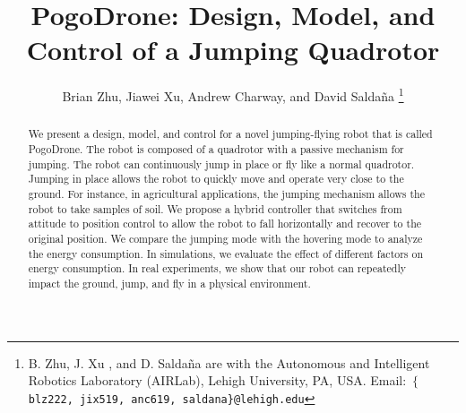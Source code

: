 \documentclass[letterpaper,10pt,conference]{ieeeconf}
\newcommand{\andrew}[1]{{\color{green}#1}}
\begin{document}
\title{\bf 
PogoDrone: Design, Model, and Control  of a Jumping Quadrotor
}
\author{Brian Zhu, Jiawei Xu, Andrew Charway, and David Saldaña
\thanks{
B. Zhu, J. Xu , and D. Salda\~{n}a are with the Autonomous and Intelligent Robotics Laboratory (AIRLab), Lehigh University, PA, USA. Email:~$\{$\texttt{blz222, jix519, anc619, saldana\}@lehigh.edu}}
}
\maketitle
\begin{abstract}
We present a design, model, and control for a novel jumping-flying robot that is called PogoDrone. The robot is composed of a quadrotor with a passive mechanism for jumping.
%
The robot can continuously jump in place or fly like a normal quadrotor. Jumping in place allows the robot to quickly move and operate very close to the ground.
For instance, in agricultural applications, the jumping mechanism allows the robot to take samples of soil.
We propose a hybrid controller that switches from attitude to position control to allow the robot to fall horizontally and recover to the original position.
We compare the jumping mode with the hovering mode to analyze the energy consumption.
In simulations, we evaluate the effect of different factors
on energy consumption. In real experiments, we show that our robot can repeatedly impact the ground, jump, and fly in a physical environment.
%


\end{abstract}
\end{document}
